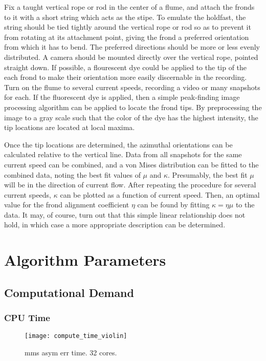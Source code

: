 Fix a taught vertical rope or rod in the center of a flume, and attach the fronds to it with a short string which acts as the stipe.
To emulate the holdfast, the string should be tied tightly around the vertical rope or rod so as to prevent it from rotating at its attachment point,
giving the frond a preferred orientation from which it has to bend.
The preferred directions should be more or less evenly distributed.
A camera should be mounted directly over the vertical rope, pointed straight down.
If possible, a flourescent dye could be applied to the tip of the each frond to make their orientation more easily discernable in the recording.
Turn on the flume to several current speeds, recording a video or many snapshots for each.
If the fluorescent dye is applied, then a simple peak-finding image processing algorithm can be applied to locate the frond tips.
By preprocessing the image to a gray scale such that the color of the dye has the highest intensity,
the tip locations are located at local maxima.

Once the tip locations are determined, the azimuthal orientations can be calculated relative to the vertical line.
Data from all snapshots for the same current speed can be combined, and a von Mises distribution can be fitted to the combined data,
noting the best fit values of $\mu$ and $\kappa$.
Presumably, the best fit $\mu$ will be in the direction of current flow.
After repeating the procedure for several current speeds, $\kappa$ can be plotted as a function of current speed.
Then, an optimal value for the frond alignment coefficient $\eta$ can be found by fitting $\kappa = \eta\mu$ to the data.
It may, of course, turn out that this simple linear relationship does not hold, in which case a more appropriate description can be determined.

\section{Algorithm Parameters}

\subsection{Computational Demand}
\subsubsection{CPU Time}

\begin{figure}[H]
  \centering
  \texttt{[image: compute\_time\_violin]}
  \caption{mms asym err time. 32 cores.}
  \label{fig:compute_time_violin}
\end{figure}


